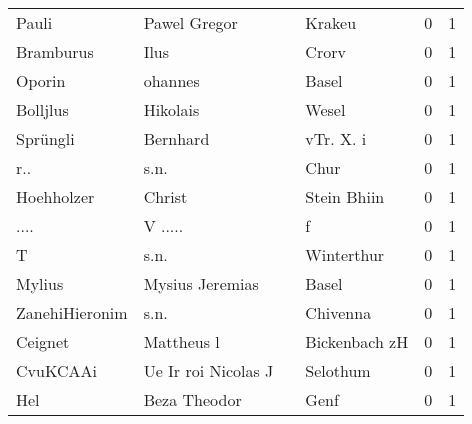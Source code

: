 \begin{tabular}{llllrr}
                    Pauli &                       Pawel Gregor &             &                                      Krakeu &          0 &         1 \\
                Bramburus &                               Ilus &             &                                       Crorv &          0 &         1 \\
                   Oporin &                            ohannes &             &                                       Basel &          0 &         1 \\
                 Bolljlus &                           Hikolais &             &                                       Wesel &          0 &         1 \\
                 Sprüngli &                           Bernhard &             &                                   vTr. X. i &          0 &         1 \\
                      r.. &                               s.n. &             &                                        Chur &          0 &         1 \\
               Hoehholzer &                             Christ &             &                                 Stein Bhiin &          0 &         1 \\
                     .... &                            V ..... &             &                                           f &          0 &         1 \\
                        T &                               s.n. &             &                                  Winterthur &          0 &         1 \\
                   Mylius &                    Mysius Jeremias &             &                                       Basel &          0 &         1 \\
           ZanehiHieronim &                               s.n. &             &                                    Chivenna &          0 &         1 \\
                  Ceignet &                         Mattheus l &             &                               Bickenbach zH &          0 &         1 \\
                 CvuKCAAi &                Ue Ir roi Nicolas J &             &                                    Selothum &          0 &         1 \\
                      Hel &                       Beza Theodor &             &                                        Genf &          0 &         1 \\

\end{tabular}
